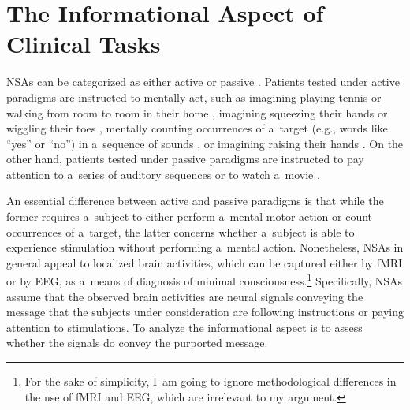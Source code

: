 \section{The Informational Aspect of Clinical Tasks}
NSAs can be categorized as either active or passive
\parencite[][]{kondziella_preserved_2016}. %
 Patients tested under active paradigms are instructed to mentally act, such as imagining playing tennis or walking from room to room in their home 
\parencites[][]{owen_detecting_2006}[][]{monti_willful_2010}, %
 imagining squeezing their hands or wiggling their toes 
\parencite[][]{cruse_bedside_2011}, %
 mentally counting occurrences of a~target (e.g., words like ``yes'' or ``no'') in a~sequence of sounds 
\parencites[][]{lule_probing_2013}[][]{naci_making_2013}, %
 or imagining raising their hands 
\parencite[][]{wang_detecting_2019}. %
 On the other hand, patients tested under passive paradigms are instructed to pay attention to a~series of auditory sequences 
\parencites[][]{boly_preserved_2011}[][]{king_single-trial_2013} %
 or to watch a~movie 
\parencites[][]{naci_common_2014}[][]{laforge_individualized_2020}.%


An essential difference between active and passive paradigms is that while the former requires a~subject to either perform a~mental-motor action or count occurrences of a~target, the latter concerns whether a~subject is able to experience stimulation without performing a~mental action. Nonetheless, NSAs in general appeal to localized brain activities, which can be captured either by fMRI or by EEG, as a~means of diagnosis of minimal consciousness.\footnote{ For the sake of simplicity, I~am going to ignore methodological differences in the use of fMRI and EEG, which are irrelevant to my argument.} Specifically, NSAs assume that the observed brain activities are neural signals conveying the message that the subjects under consideration are following instructions or paying attention to stimulations. To analyze the informational aspect is to assess whether the signals do convey the purported message.

